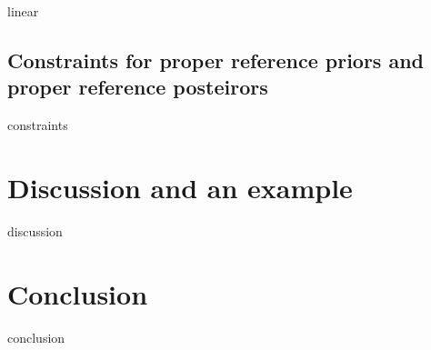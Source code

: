     linear

    \subsection{Constraints for proper reference priors and proper reference posteirors}

    constraints


\section{Discussion and an example}

discussion


\section{Conclusion}

conclusion






